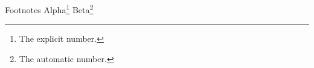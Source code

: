 \documentclass[aspectratio=169]{beamer}
\begin{document}
\begin{frame}{Footnotes}
Alpha\footnote[7]{The explicit number.} Beta\footnote{The automatic number.}
\end{frame}
\end{document}
